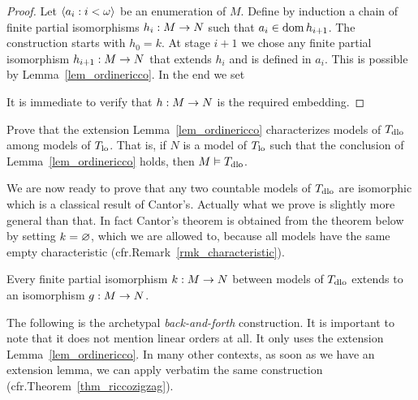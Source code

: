\documentclass[creche.tex]{subfiles}
\begin{document}
\begin{proof}
Let $\<a_i:i<\omega\>$ be an enumeration of $M$. Define by induction a chain of finite partial isomorphisms $h_i:M\imp N$ such that $a_i\in\dom h_{i+1}$. The construction starts with $h_0=k$. At stage $i+1$ we chose any finite partial isomorphism $h_{i+1}:M\imp N$ that extends $h_i$ and is defined in $a_i$. This is possible by Lemma~\ref{lem_ordinericco}. In the end we set


It is immediate to verify that $h:M\imp N$ is the required embedding.
\end{proof}


\begin{exercise}\label{ex_ricco->dlo}
Prove that the extension Lemma~\ref{lem_ordinericco} characterizes models of $T_{\rm dlo}$ among models of $T_{\rm lo}$. That is, if $N$ is a model of $T_{\rm lo}$ such that the conclusion of Lemma~\ref{lem_ordinericco} holds, then $M\models  T_{\rm dlo}$.\QED
\end{exercise}


We are now ready to prove that any two countable models of $T_{\rm dlo}$ are isomorphic which is a classical result of Cantor's. Actually what we prove is slightly more general than that. In fact Cantor's theorem is obtained from the theorem below by setting $k=\0$, which we are allowed to, because all models have the same empty characteristic (cfr.\@ Remark~\ref{rmk_characteristic}).

\begin{theorem}\label{zigzagcantor}
Every finite partial isomorphism $k:M\imp N$ between models of $T_{\rm dlo}$ extends to an isomorphism $g:M\imp N$.
\end{theorem}

The following is the archetypal \emph{back-and-forth\/} construction. It is important to note that it does not mention linear orders at all. It only uses the extension Lemma~\ref{lem_ordinericco}. In many other contexts, as soon as we have an extension lemma, we can apply verbatim the same construction (cfr.\@ Theorem~\ref{thm_riccozigzag}).
\end{document}
